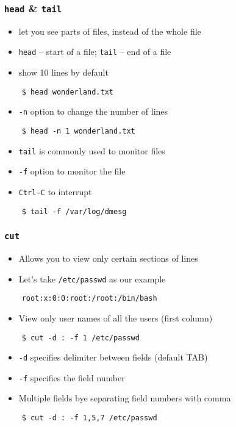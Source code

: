 \documentclass[12pt,compress]{beamer}
\begin{document}
\begin{frame}[fragile]
  \frametitle{\texttt{head} \& \texttt{tail}}
  \begin{itemize}
  \item let you see parts of files, instead of the whole file
  \item \texttt{head} -- start of a file; \texttt{tail} -- end of a
    file 
  \item show 10 lines by default
  \end{itemize}
  \begin{lstlisting}
    $ head wonderland.txt
  \end{lstlisting} %
  \begin{itemize}
  \item \texttt{-n} option to change the number of lines
  \end{itemize}
  \begin{lstlisting}
    $ head -n 1 wonderland.txt
  \end{lstlisting} %
  \begin{itemize}
  \item \texttt{tail} is commonly used to monitor files
  \item \texttt{-f} option to monitor the file
  \item \texttt{Ctrl-C} to interrupt
  \end{itemize}
  \begin{lstlisting}
    $ tail -f /var/log/dmesg
  \end{lstlisting} %
\end{frame}


\begin{frame}[fragile]
  \frametitle{\texttt{cut}}
  \begin{itemize}
  \item Allows you to view only certain sections of lines
  \item Let's take \texttt{/etc/passwd} as our example 
  \end{itemize}
  \begin{lstlisting}
    root:x:0:0:root:/root:/bin/bash
  \end{lstlisting}
  \begin{itemize}
  \item View only user names of all the users (first column)
  \end{itemize}
  \begin{lstlisting}
    $ cut -d : -f 1 /etc/passwd
  \end{lstlisting} %
  \begin{itemize}
  \item \texttt{-d} specifies delimiter between fields (default TAB)
  \item \texttt{-f} specifies the field number
  \item Multiple fields bye separating field numbers with comma
  \end{itemize}
  \begin{lstlisting}
    $ cut -d : -f 1,5,7 /etc/passwd
  \end{lstlisting} %
\end{frame}
\end{document}
